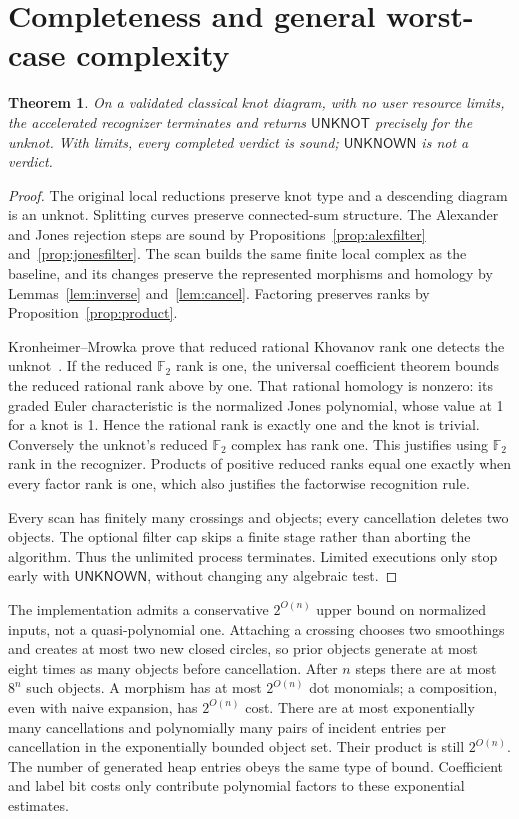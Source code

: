 \documentclass[11pt]{article}
\newtheorem{theorem}{Theorem}[section]
\theoremstyle{definition}\newtheorem{definition}[theorem]{Definition}
\theoremstyle{remark}\newtheorem{remark}[theorem]{Remark}
\newcommand{\F}{\mathbb F_2}
\newcommand{\unk}{\textsf{UNKNOT}}
\newcommand{\unknown}{\textsf{UNKNOWN}}
\begin{document}
\section{Completeness and general worst-case complexity}\label{sec:complete}
\begin{theorem}\label{thm:correct}
On a validated classical knot diagram, with no user resource limits, the
accelerated recognizer terminates and returns $\unk$ precisely for the unknot.
With limits, every completed verdict is sound; $\unknown$ is not a verdict.
\end{theorem}
\begin{proof}
The original local reductions preserve knot type and a descending diagram is
an unknot. Splitting curves preserve connected-sum structure. The Alexander
and Jones rejection steps are sound by
Propositions~\ref{prop:alexfilter} and~\ref{prop:jonesfilter}. The scan builds
the same finite local complex as the baseline, and its changes preserve the
represented morphisms and homology by Lemmas~\ref{lem:inverse}
and~\ref{lem:cancel}. Factoring preserves ranks by
Proposition~\ref{prop:product}.

Kronheimer--Mrowka prove that reduced rational Khovanov rank one detects the
unknot~\cite{KM}. If the reduced $\F$ rank is one, the universal coefficient
theorem bounds the reduced rational rank above by one. That rational homology
is nonzero: its graded Euler characteristic is the normalized Jones polynomial,
whose value at 1 for a knot is 1. Hence the rational rank is exactly one and
the knot is trivial. Conversely the unknot's reduced $\F$ complex has rank one.
This justifies using $\F$ rank in the recognizer. Products of positive reduced
ranks equal one exactly when every factor rank is one, which also justifies the
factorwise recognition rule.

Every scan has finitely many crossings and objects; every cancellation deletes
two objects. The optional filter cap skips a finite stage rather than aborting
the algorithm. Thus the unlimited process terminates. Limited executions only
stop early with $\unknown$, without changing any algebraic test.
\end{proof}

The implementation admits a conservative $2^{O(n)}$ upper bound on normalized
inputs, not a quasi-polynomial one. Attaching a crossing chooses two smoothings
and creates at most two new closed circles, so prior objects generate at most
eight times as many objects before cancellation. After $n$ steps there are at
most $8^n$ such objects. A morphism has at most $2^{O(n)}$ dot monomials; a
composition, even with naive expansion, has $2^{O(n)}$ cost. There are at most
exponentially many cancellations and polynomially many pairs of incident
entries per cancellation in the exponentially bounded object set. Their
product is still $2^{O(n)}$. The number of generated heap entries obeys the
same type of bound. Coefficient and label bit costs only contribute polynomial
factors to these exponential estimates.
\end{document}
